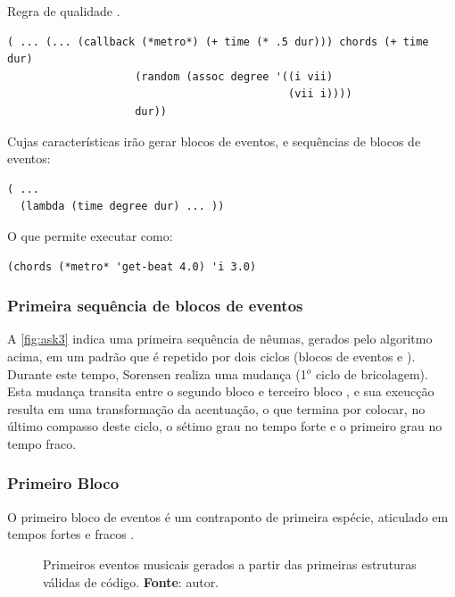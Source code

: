 \begin{example}{Regra de qualidade .}
\begin{verbatim}
( ... (... (callback (*metro*) (+ time (* .5 dur))) chords (+ time dur)
                    (random (assoc degree '((i vii)
                                            (vii i))))
                    dur))
\end{verbatim}

Cujas características irão gerar blocos de eventos, e sequências de blocos de eventos:

\begin{verbatim}
( ...
  (lambda (time degree dur) ... ))
\end{verbatim}

O que permite executar como:
\begin{verbatim}
(chords (*metro* 'get-beat 4.0) 'i 3.0)
\end{verbatim}
\end{example}

\subsubsection{Primeira sequência de blocos de eventos}\label{sec:primeiro_evento}

A \autoref{fig:ask3} indica uma primeira sequência de nêumas, gerados pelo algoritmo acima, em um padrão que é repetido por dois ciclos (blocos de eventos  e ). Durante este tempo, Sorensen realiza uma mudança (1$^o$ ciclo de bricolagem). Esta mudança transita entre o segundo bloco  e terceiro bloco , e sua exeucção resulta em uma transformação da acentuação, o que termina por colocar, no último compasso deste ciclo, o sétimo grau no tempo forte e o primeiro grau no tempo fraco. 

\subsubsection*{Primeiro Bloco}

O primeiro bloco de eventos  é um contraponto de primeira espécie, aticulado em tempos fortes e fracos . 

\begin{figure}[!h]
  \centering
  
  \caption{Primeiros eventos musicais gerados a partir das primeiras estruturas válidas de código. \textbf{Fonte}: autor.}
  \label{fig:ask3}
\end{figure}

